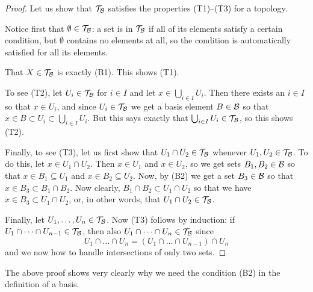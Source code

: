 \begin{proof}
  Let us show that $\mathcal{T}_{\mathcal{B}}$ satisfies the properties (T1)--(T3) for a topology.

  Notice first that $\emptyset \in \mathcal{T}_{\mathcal{B}}$: a set is in $\mathcal{T}_{\mathcal{B}}$ if all of its elements satisfy a certain condition, but $\emptyset$ contains no elements at all, so the condition is automatically satisfied for all its elements.
  
  That $X \in \mathcal{T}_{\mathcal{B}}$ is exactly (B1). This shows (T1).
  
  To see (T2), let $U_i \in \mathcal{T}_{\mathcal{B}}$ for $i \in I$ and let $x \in \bigcup_{i \in I} U_i$. Then there exists an $i \in I$ so that $x \in U_i$, and since $U_i \in \mathcal{T}_{\mathcal{B}}$ we get a basis element $B \in \mathcal{B}$ so that $x \in B \subset U_i \subset \bigcup_{i \in I} U_i$. But this says exactly that $\bigcup_{i \in I} U_i \in \mathcal{T}_{\mathcal{B}}$, so this shows (T2).
  
  Finally, to see (T3), let us first show that $U_1 \cap U_2 \in \mathcal{T}_{\mathcal{B}}$ whenever $U_1, U_2 \in \mathcal{T}_{\mathcal{B}}$. To do this, let $x \in U_1 \cap U_2$. Then $x \in U_1$ and $x \in U_2$, so we get sets $B_1, B_2 \in \mathcal{B}$ so that $x \in B_1 \subseteq U_1$ and $x \in B_2 \subseteq U_2$. Now, by (B2) we get a set $B_3 \in \mathcal{B}$ so that $x \in B_3 \subset B_1 \cap B_2$. Now clearly, $B_1 \cap B_2 \subset U_1 \cap U_2$ so that we have $x \in B_3 \subset U_1 \cap U_2$, or, in other words, that $U_1 \cap U_2 \in \mathcal{T}_{\mathcal{B}}$.
  
  Finally, let $U_1, \dots, U_n \in \mathcal{T}_{\mathcal{B}}$. Now (T3) follows by induction: if $U_1 \cap \dots \cap U_{n-1} \in \mathcal{T}_{\mathcal{B}}$, then also $U_1 \cap \dots \cap U_n \in \mathcal{T}_{\mathcal{B}}$ since
  \[
    U_1 \cap \dots \cap U_n = (U_1 \cap \dots \cap U_{n-1}) \cap U_n
  \]
  and we now how to handle intersections of only two sets.
\end{proof}
The above proof shows very clearly why we need the condition (B2) in the definition of a basis.


